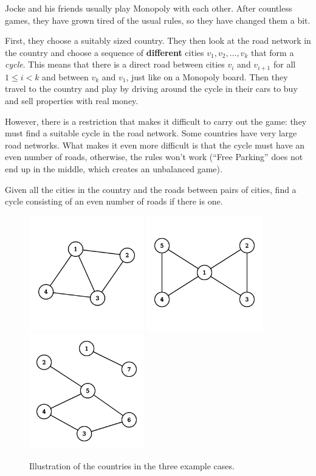 \noindent
Jocke and his friends usually play Monopoly with each other.
After countless games, they have grown tired of the usual rules, so they have changed them a bit.

First, they choose a suitably sized country.
They then look at the road network in the country and choose a sequence of \textbf{different} cities $v_1, v_2, \dots, v_k$ that form a \emph{cycle}.
This means that there is a direct road between cities $v_i$ and $v_{i+1}$ for all $1 \le i < k$ and between $v_k$ and $v_1$, just like on a Monopoly board.
Then they travel to the country and play by driving around the cycle in their cars to buy and sell properties with real money.

However, there is a restriction that makes it difficult to carry out the game: they must find a suitable cycle in the road network.
Some countries have very large road networks.
What makes it even more difficult is that the cycle must have an even number of roads, otherwise, the rules won't work (``Free Parking'' does not end up in the middle, which creates an unbalanced game).

Given all the cities in the country and the roads between pairs of cities, find a cycle consisting of an even number of roads if there is one.

\begin{figure}[!h]
  \centering
  \includegraphics[width=5cm]{sample1.png}
  \quad
  \includegraphics[width=5cm]{sample2.png}
  \quad
  \includegraphics[width=5cm]{sample3.png}
  \caption{Illustration of the countries in the three example cases.}
\end{figure}

